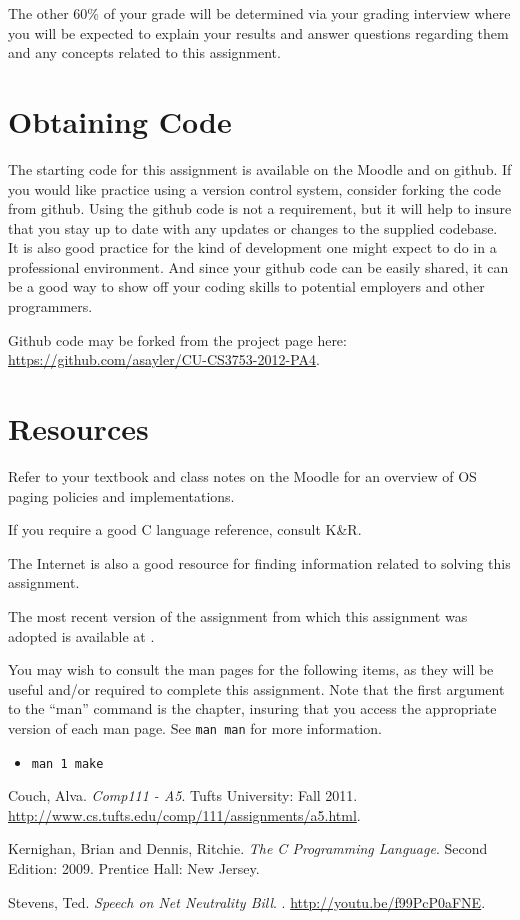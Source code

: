 \documentclass[12pt]{article}
\begin{document}
The other 60\% of your grade will be determined via your grading
interview where you will be expected to explain your results and answer
questions regarding them and any concepts related to this assignment.

\section{Obtaining Code}
The starting code for this assignment is available on the Moodle and
on github. If you would like practice using a version control system,
consider forking the code from github. Using the github code is not
a requirement, but it will help to insure that you stay up to date
with any updates or changes to the supplied codebase. It is also
good practice for the kind of development one might expect to do in
a professional environment. And since your github code can be easily
shared, it can be a good way to show off your coding skills to
potential employers and other programmers.

Github code may be forked from the project page here:\\
\url{https://github.com/asayler/CU-CS3753-2012-PA4}.

\section{Resources}
Refer to your textbook and class notes on the Moodle for an overview
of OS paging policies and implementations.

If you require a good C language reference, consult K\&R\cite{K+R}.

The Internet\cite{tubes} is also a good resource for finding
information related to solving this assignment.

The most recent version of the assignment from which this assignment
was adopted is available at \cite{couch-a5}.

You may wish to consult the man pages for the following items, as they
will be useful and/or required to complete this assignment. Note that
the first argument to the ``man'' command is the chapter, insuring
that you access the appropriate version of each man page. See
\texttt{man man} for more information.

\begin{itemize}
\item \texttt{man 1 make}
\end{itemize}

\begin{thebibliography}{9}

 Couch, Alva.
  \newblock \emph{Comp111 - A5}.
  \newblock Tufts University: Fall 2011.
  \newblock \url{http://www.cs.tufts.edu/comp/111/assignments/a5.html}.

 Kernighan, Brian and Dennis, Ritchie.
  \newblock \emph{The C Programming Language}.
  \newblock Second Edition: 2009.
  \newblock Prentice Hall: New Jersey.

 Stevens, Ted.
  \newblock \emph{Speech on Net Neutrality Bill}.
  .
  \newblock \url{http://youtu.be/f99PcP0aFNE}.

\end{thebibliography}
\end{document}
